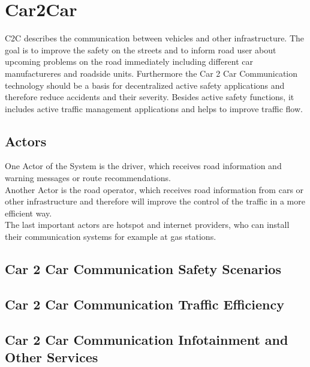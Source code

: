 \chapter{Car2Car}
\label{cha:Car2Car}
C2C describes the communication between vehicles and other infrastructure. The goal is to improve the safety on the streets and to inform road user about upcoming problems on the road immediately including different car manufactureres and roadside units. Furthermore the Car 2 Car Communication technology should be a basis for decentralized active safety applications and therefore reduce accidents and their severity. Besides active safety functions, it includes active traffic management applications and helps to improve traffic flow.

\section{Actors}
\label{sec:Actors}
One Actor of the System is the driver, which receives road information and warning messages or route recommendations.\\
Another Actor is the road operator, which receives road information from cars or other infrastructure and therefore will improve the control of the traffic in a more efficient way.\\
The last important actors are hotspot and internet providers, who can install their communication systems for example at gas stations.

\section{Car 2 Car Communication Safety Scenarios}
\label{sec:C2CSafetyScenarios}

\section{Car 2 Car Communication Traffic Efficiency}
\label{sec:C2CTarfficEfficiency}

\section{Car 2 Car Communication Infotainment and Other Services}
\label{sec:C2COtherServices}